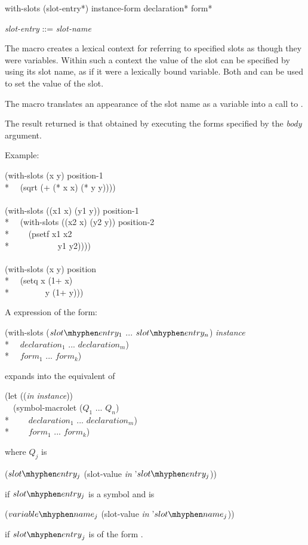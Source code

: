 \begin{defmac}
with-slots ({slot-entry}*) instance-form {declaration}* {form}*

\begin{tabbing}
\emph{slot-entry\/} ::= \emph{slot-name\/} {\Mor} 
\end{tabbing}
The macro  creates a lexical context for referring to
specified slots as though they were variables.  Within such a context
the value of the slot can be specified by using its slot name, as if
it were a lexically bound variable.  Both  and 
can be used to set the value of the slot.

The macro  translates an appearance of the slot name as
a variable into a call to .

  



The result returned is that obtained by executing the forms specified
by the \emph{body\/} argument.

Example:

\begin{lisp}
(with-slots (x y) position-1 \\*
~~(sqrt (+ (* x x) (* y y)))) \\
\\
(with-slots ((x1 x) (y1 y)) position-1 \\*
~~(with-slots ((x2 x) (y2 y)) position-2 \\*
~~~~(psetf x1 x2 \\*
~~~~~~~~~~~y1 y2)))) \\
\\
(with-slots (x y) position \\*
~~(setq x (1+ x) \\*
~~~~~~~~y (1+ y)))
\end{lisp}


A  expression of the form:
\begin{lisp}
(with-slots ($slot\mhyphen entry_{1}$ ... $slot\mhyphen entry_{n}$) \emph{instance} \\*
~~$declaration_1$ ... $declaration_{m}$) \\*
~~$form_1$ ... $form_{k}$)
\end{lisp}
expands into the equivalent of
\begin{lisp}
(let ((\emph{in\/} \emph{instance\/})) \\
~~(symbol-macrolet ($Q_1$ ... $Q_{n}$) \\*
~~~~$declaration_1$ ... $declaration_{m}$) \\*
~~~~$form_1$ ... $form_{k}$)
\end{lisp}
where ${Q}_{j}$ is 
\begin{lisp}
($slot\mhyphen entry_{j}$ (slot-value \emph{in} '$slot\mhyphen entry_{j}$))
\end{lisp}
if $slot\mhyphen entry_{j}$ is a symbol and is
\begin{lisp}
($variable\mhyphen name_{j}$ (slot-value \emph{in\/} '$slot\mhyphen name_{j}$))
\end{lisp}
if ${slot\mhyphen entry}_{j}$
is of the form .


\end{defmac}
